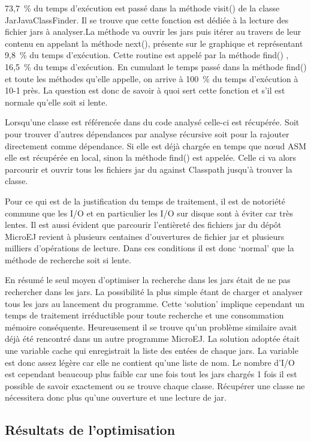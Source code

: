 \documentclass[french,a4paper,12pt]{report}
\begin{document}
73,7 \% du temps d’exécution est passé dans la méthode visit() de la classe JarJavaClassFinder. Il se trouve que cette fonction est dédiée à la lecture des fichier jars à analyser.La méthode va ouvrir les jars puis itérer au travers de leur contenu en appelant la méthode next(), présente sur le graphique et représentant 9,8 \% du temps d’exécution. Cette routine est appelé par la méthode find() , 16,5 \% du temps d’exécution. En cumulant le temps passé dans la méthode find() et toute les méthodes qu'elle appelle, on arrive à 100 \% du temps d’exécution à 10-1 près. La question est donc de savoir à quoi sert cette fonction et s'il est normale qu’elle soit si lente.

Lorsqu’une classe est référencée dans du code analysé celle-ci est récupérée. Soit pour trouver d’autres dépendances par analyse récursive soit pour la rajouter directement comme dépendance. Si elle est déjà chargée en temps que nœud ASM elle est récupérée en local, sinon la méthode find() est appelée. Celle ci va alors parcourir et ouvrir tous les fichiers jar du against Classpath jusqu’à trouver la classe.

Pour ce qui est de la justification du temps de traitement, il est de notoriété commune que les I/O et en particulier les I/O sur disque sont à éviter car très lentes. Il est aussi évident que parcourir l’entièreté des fichiers jar du dépôt MicroEJ revient à plusieurs centaines d’ouvertures de fichier jar et plusieurs milliers d’opérations de lecture. Dans ces conditions il est donc ‘normal’ que la méthode de recherche soit si lente.

En résumé le seul moyen d’optimiser la recherche dans les jars était de ne pas rechercher dans les jars. La possibilité la plus simple étant de charger et analyser tous les jars au lancement du programme. Cette ‘solution’ implique cependant un temps de traitement irréductible pour toute recherche et une consommation mémoire conséquente. Heureusement il se trouve qu’un problème similaire avait déjà été rencontré dans un autre programme MicroEJ. La solution adoptée était une variable cache qui enregistrait la liste des entées de chaque jars. La variable est donc assez légère car elle ne contient qu’une liste de nom. Le nombre d’I/O est cependant beaucoup plus faible car une fois tout les jars chargés 1 fois il est possible de savoir exactement ou se trouve chaque classe. Récupérer une classe ne nécessitera donc plus qu’une ouverture et une lecture de jar.

\subsection{Résultats de l’optimisation}
\end{document}
